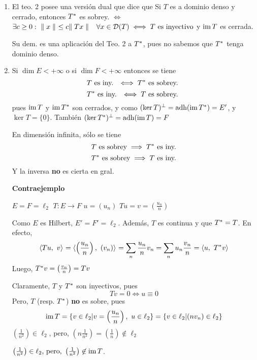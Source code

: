 \begin{enumerate}[(1)]
    \item El teo. 2 posee una versión dual que dice que Si $T$ es a dominio denso y cerrado, entonces $T \adj $ es sobrey. $\iff$ $\exists c \geq 0:\ 
    \norm[]{x} 
    \leq c \norm[]{Tx} \quad \forall x \in \cd(T) \iff T \text{ es inyectivo}
    $ y $\im T$ es cerrada.
    
    Su dem. es una aplicación del Teo. 2 a $T\adj$, pues no sabemos que $T\adj$ tenga dominio denso.
    \item Si $\dim E < + \infty$ o si $\dim F < +\infty$ entonces se tiene $$
    T \text{ es iny. } \iff T\adj \text{ es sobrey. }
    $$ $$
    T\adj \text{ es iny. } \iff T \text{ es sobrey. }
    $$ pues $\im T$ y $\im T\adj$ son cerrados, y
    como $
    (\ker T)\ort = \adh(\im T\adj) = E'
    $, y $
    \ker T = \{ 0 \}
    $. También $
    (\ker T\adj )\ort = \adh( \im T ) = F
    $
    
    En dimensión infinita, sólo se tiene $$
    T \text{ es sobrey} \implies T\adj \text{ es iny.}
    $$ $$
    T\adj \text{ es sobrey} \implies T \text{ es iny.}
    $$ Y la inversa \textbf{no} es cierta en gral.
    
    \textbf{Contraejemplo}
    
    $E = F = \ell_{2}$
    $T : E \to F$
    $u = (u_n)$
    $T u = v = \left( \frac{u_n}{n} \right)
    $
    
    Como $E$ es Hilbert, $E' = F' = \ell_{2}$. Además, $T$ es continua y que $T\adj = T$. En efecto, $$
    \prodint[]{Tu}{v} 
    = \prodint[]{ \left( \frac{u_n}{n} \right) }{ (v_n) } 
    = \sum_{n} \frac{u_n}{n} v_n
    = \sum_n u_n \frac{v_n}{n}
    = \prodint[]{u}{T\adj v}
    $$ Luego, $T\adj v = \left( \frac{v_n}{n} \right) = T v$
    
    Claramente, $T$ y $T\adj$ son inyectivos, pues $$
    T v = 0 
    \iff u \equiv 0
    $$ Pero, $T$ (resp. $T\adj$) \textbf{no} es sobre, pues $$
    \im T = \{ v \in \ell_2 | v = \left( \frac{u_n}{n} \right),\ u \in \ell_2 \} 
    = \{ v \in \ell_2 | (n v_n) \in \ell_2 \}
    $$ $\left( \frac{1}{n^2} \right) \in \ell_2$, pero, $\left( n \frac{1}{n^2} \right) = \left( \frac{1}{n} \right) \not \in \ell_2$
    
    $\left( \frac{1}{n^2} \right) \in \ell_2\text{, pero, } \left( \frac{1}{n^2} \right) \not \in \im T$.
    
\end{enumerate}

